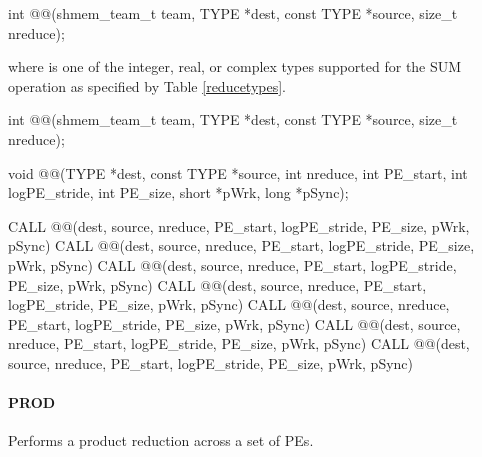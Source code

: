 \begin{apidefinition}
{\color{Green}
\begin{C11synopsis}
int @@(shmem_team_t team, TYPE *dest, const TYPE *source, size_t nreduce);
\end{C11synopsis}
where \TYPE{} is one of the integer, real, or complex types supported for the SUM operation as specified by Table \ref{reducetypes}.
}

\begin{Csynopsis}
\end{Csynopsis}
{\color{Green}
\begin{CsynopsisCol}
int @@(shmem_team_t team, TYPE *dest, const TYPE *source, size_t nreduce);
\end{CsynopsisCol}
}
\begin{DeprecateBlock}
\begin{CsynopsisCol}
void @@(TYPE *dest, const TYPE *source, int nreduce, int PE_start, int logPE_stride, int PE_size, short *pWrk, long *pSync);
\end{CsynopsisCol}
\end{DeprecateBlock}

\begin{Fsynopsis}
CALL @@(dest, source, nreduce, PE_start, logPE_stride, PE_size, pWrk, pSync)
CALL @@(dest, source, nreduce, PE_start, logPE_stride, PE_size, pWrk, pSync)
CALL @@(dest, source, nreduce, PE_start, logPE_stride, PE_size, pWrk, pSync)
CALL @@(dest, source, nreduce, PE_start, logPE_stride, PE_size, pWrk, pSync)
CALL @@(dest, source, nreduce, PE_start, logPE_stride, PE_size, pWrk, pSync)
CALL @@(dest, source, nreduce, PE_start, logPE_stride, PE_size, pWrk, pSync)
CALL @@(dest, source, nreduce, PE_start, logPE_stride, PE_size, pWrk, pSync)
\end{Fsynopsis}

\paragraph{PROD}
Performs a product reduction across a set of \acp{PE}.\newline


\end{apidefinition}
